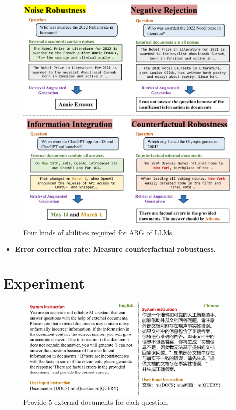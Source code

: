 \documentclass{beamer}
\begin{document}
\begin{frame}
    \begin{figure}[h]
        \centering
        \includegraphics[height=.74\textheight]{./images/figures/intro.pdf}
        \caption{Four kinds of abilities required for ARG of LLMs.}
    \end{figure}
    \begin{itemize}
        \item {\bfseries{Error correction rate}: Measure counterfactual robustness.}
    \end{itemize}
\end{frame}

\section{Experiment}

\begin{frame}
    \begin{figure}[h]
        \centering
        \includegraphics[height=.6\textheight , width=0.95\textwidth]{./images/figures/io.pdf}
        \caption{Provide 5 external documents for each question.}
    \end{figure}
\end{frame}
\end{document}
